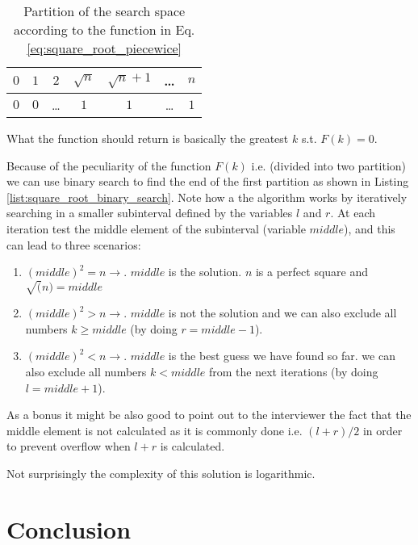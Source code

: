 \begin{table}[]
	\centering
	\begin{tabular}{|c|c|c|c|c|c|c|}
		\hline
		$0$ & $1$ & $2$   & $\sqrt{n}$ & $\sqrt{n}+1$ & \ldots   & $n$ \\ \hline
		$0$ & $0$ & \ldots & $1$ & $1$ & \ldots & $1$   \\ \hline
	\end{tabular}
\label{tab:sqrt_split_space}
\caption{Partition of the search space according to the function in Eq. \ref{eq:square_root_piecewice}}
\end{table}
What the function should return is basically the greatest $k$ s.t. $F(k)=0$. 

Because of the peculiarity of the function $F(k)$ i.e. (divided into two partition) we can use binary search to find the end of the first partition as shown in Listing \ref{list:square_root_binary_search}. Note how a the algorithm works by iteratively searching in a smaller subinterval defined by the variables $l$ and $r$. At each iteration test the middle element of the subinterval (variable $middle$), and this can lead to three scenarios:

\begin{enumerate}
 	\item $(middle)^2  = n \longrightarrow$. $middle$ is the solution. $n$ is a perfect square and $\sqrt(n)=middle$
 	\item $(middle)^2  > n \longrightarrow$. $middle$ is not the solution and we can also exclude all numbers $k \geq middle$ (by doing $r = middle-1$).
 	\item $(middle)^2  < n \longrightarrow$. $middle$ is the best guess we have found so far. we can also exclude all numbers $k < middle$ from the next iterations (by doing $l = middle+1$).
\end{enumerate}
As a bonus it might be also good to point out to the interviewer the fact that the middle element is not calculated as it is commonly done i.e. $(l+r)/2$ in order to prevent overflow when $l+r$ is calculated.

\begin{minipage}{\linewidth}

	
\end{minipage}

Not surprisingly the complexity of this solution is logarithmic.


\section{Conclusion}
